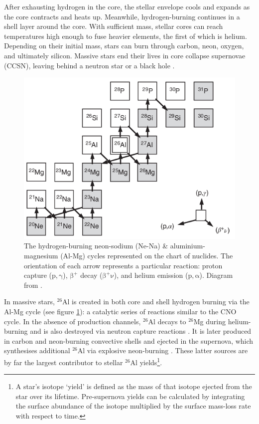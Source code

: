 After exhausting hydrogen in the core, the stellar envelope cools and expands as the core contracts and heats up. Meanwhile, hydrogen-burning continues in a shell layer around the core.
With sufficient mass, stellar cores can reach temperatures high enough to fuse heavier elements, the first of which is helium.
Depending on their initial mass, stars can burn through carbon, neon, oxygen, and ultimately silicon.
Massive stars end their lives in core collapse supernovae (CCSN), leaving behind a neutron star or a black hole \citep{Carroll2007}.

\begin{figure}
    \centering
    \includegraphics[width=\columnwidth]{figures/intro/AlMg.png}
    \captionsetup{width=0.9\columnwidth}
    \caption{The hydrogen-burning neon-sodium (Ne-Na) \& aluminium-magnesium (Al-Mg) cycles represented on the chart of nuclides.
    The orientation of each arrow represents a particular reaction: proton capture ($\mathrm{p,\gamma}$), $\mathrm{\beta^+}$ decay ($\mathrm{\beta^+\nu}$), and helium emission ($\mathrm{p,\alpha}$).
    Diagram from \cite{Iliadis2015}.}
    \label{fig:reactions}
\end{figure}

In massive stars, $^{26}$Al is created in both core and shell hydrogen burning via the Al-Mg cycle (see figure \ref{fig:reactions}): a catalytic series of reactions similar to the CNO cycle.
In the absence of production channels, $^{26}$Al decays to $^{26}$Mg during helium-burning and is also destroyed via neutron capture reactions \citep{2019ApJ...884...38B}.
It is later produced in carbon and neon-burning convective shells \citep{1978ApJ...224L.139A} and ejected in the supernova, which synthesises additional $^{26}$Al via explosive neon-burning \citep{2006ApJ...647..483L}.
These latter sources are by far the largest contributor to stellar $^{26}$Al yields\footnote{A star's isotope `yield' is defined as the mass of that isotope ejected from the star over its lifetime. Pre-supernova yields can be calculated by integrating the surface abundance of the isotope multiplied by the surface mass-loss rate with respect to time.}.

